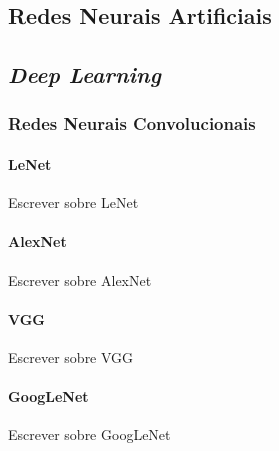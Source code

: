 \subsection{Redes Neurais Artificiais}


\subsection{\textit{Deep Learning}}


\subsubsection{Redes Neurais Convolucionais}



\paragraph{LeNet} Escrever sobre LeNet
\paragraph{AlexNet} Escrever sobre AlexNet
\paragraph{VGG} Escrever sobre VGG
\paragraph{GoogLeNet} Escrever sobre GoogLeNet


